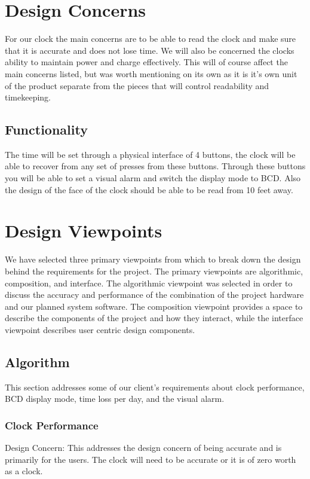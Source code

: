 \documentclass[10pt,draftclsnofoot,onecolumn]{IEEEtran}
\begin{document}
\section{Design Concerns}

For our clock the main concerns are to be able to read the clock and make sure that it is accurate and does not lose time.
We will also be concerned the clocks ability to maintain power and charge effectively.
This will of course affect the main concerns listed, but was worth mentioning on its own as it is it's own unit of the product separate from the pieces that will control readability and timekeeping.

\subsection{Functionality}
The time will be set through a physical interface of 4 buttons, the clock will be able to recover from any set of presses from these buttons.
Through these buttons you will be able to set a visual alarm and switch the display mode to BCD.
Also the design of the face of the clock should be able to be read from 10 feet away.

\section{Design Viewpoints}

We have selected three primary viewpoints from which to break down the design behind the requirements for the project.
The primary viewpoints are algorithmic, composition, and interface.
The algorithmic viewpoint was selected in order to discuss the accuracy and performance of the combination of the project hardware and our planned system software.
The composition viewpoint provides a space to describe the components of the project and how they interact, while the interface viewpoint describes user centric design components.


\subsection{Algorithm}
This section addresses some of our client's requirements about clock performance, BCD display mode, time loss per day, and the visual alarm.

\subsubsection{Clock Performance}
\hfill \break \indent Design Concern: This addresses the design concern of being accurate and is primarily for the users.
The clock will need to be accurate or it is of zero worth as a clock.
\end{document}
